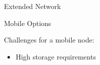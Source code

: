 \documentclass[handout]{beamer}
\begin{document}
%		


\begin{frame}{Extended Network}
	\centering
	\begin{tikzpicture}[scale=1, every node/.style={scale=1}]
		
	\end{tikzpicture}
\end{frame}

\begin{frame}{Mobile Options}

Challenges for a mobile node:

\begin{itemize}
	\item High storage requirements
\end{itemize}



\end{frame}

\end{document}
